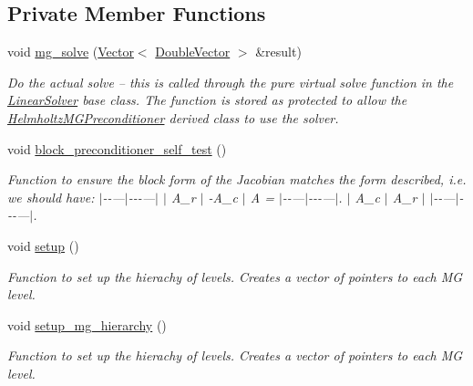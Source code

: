 \subsection*{Private Member Functions}
\begin{DoxyCompactItemize}
\item 
void \hyperlink{classoomph_1_1HelmholtzMGPreconditioner_aedd9102297d40354bd8d769ca2c343cb}{mg\+\_\+solve} (\hyperlink{classoomph_1_1Vector}{Vector}$<$ \hyperlink{classoomph_1_1DoubleVector}{Double\+Vector} $>$ \&result)
\begin{DoxyCompactList}\small\item\em Do the actual solve -- this is called through the pure virtual solve function in the \hyperlink{classoomph_1_1LinearSolver}{Linear\+Solver} base class. The function is stored as protected to allow the \hyperlink{classoomph_1_1HelmholtzMGPreconditioner}{Helmholtz\+M\+G\+Preconditioner} derived class to use the solver. \end{DoxyCompactList}\item 
void \hyperlink{classoomph_1_1HelmholtzMGPreconditioner_a935a8245757bc2bd7bf29f1ce029af77}{block\+\_\+preconditioner\+\_\+self\+\_\+test} ()
\begin{DoxyCompactList}\small\item\em Function to ensure the block form of the Jacobian matches the form described, i.\+e. we should have\+: $\vert$-\/-\/---$\vert$-\/-\/-\/---$\vert$ $\vert$ A\+\_\+r $\vert$ -\/\+A\+\_\+c $\vert$ A = $\vert$-\/-\/---$\vert$-\/-\/-\/---$\vert$. $\vert$ A\+\_\+c $\vert$ A\+\_\+r $\vert$ $\vert$-\/-\/---$\vert$-\/-\/-\/---$\vert$. \end{DoxyCompactList}\item 
void \hyperlink{classoomph_1_1HelmholtzMGPreconditioner_aba7a7fb0549452ac56c7e97bd5557c3f}{setup} ()
\begin{DoxyCompactList}\small\item\em Function to set up the hierachy of levels. Creates a vector of pointers to each MG level. \end{DoxyCompactList}\item 
void \hyperlink{classoomph_1_1HelmholtzMGPreconditioner_ad811c870bf06b25f3237c84b5037e089}{setup\+\_\+mg\+\_\+hierarchy} ()
\begin{DoxyCompactList}\small\item\em Function to set up the hierachy of levels. Creates a vector of pointers to each MG level. \end{DoxyCompactList}\item 

\end{DoxyCompactItemize}
